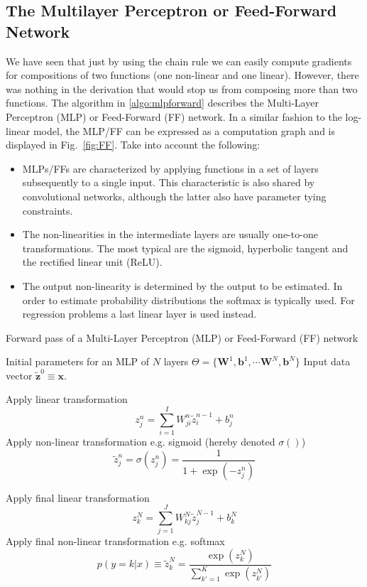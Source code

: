 \subsection{The Multilayer Perceptron or Feed-Forward Network}

We have seen that just by using the chain rule we can easily compute gradients for
compositions of two functions (one non-linear and one linear). However, there
was nothing in the derivation that would stop us from composing more than two
functions. The algorithm in \ref{algo:mlpforward} describes the Multi-Layer Perceptron (MLP) or Feed-Forward (FF) network. In a similar fashion to the log-linear model, the MLP/FF can be expressed as a computation graph and is displayed in Fig.~\ref{fig:FF}. Take into account the following:

%
\begin{itemize}
\item MLPs/FFs are characterized by applying functions in a set of layers subsequently to a single input. This characteristic is also shared by convolutional networks, although the latter also have parameter tying constraints.
\item The non-linearities in the intermediate layers are usually one-to-one transformations. The most typical are the sigmoid, hyperbolic tangent and the rectified linear unit (ReLU).
\item The output non-linearity is determined by the output to be estimated. In order to estimate probability distributions the softmax is typically used. For regression problems a last linear layer is used instead.
\end{itemize}



\begin{algorithm}[th!]
   \caption{Forward pass of a Multi-Layer Perceptron (MLP) or Feed-Forward (FF) network}
\begin{algorithmic}[1]
\label{algo:mlpforward}

    Initial parameters for an MLP of $N$ layers $\Theta=\{\mathbf{W}^1, \mathbf{b}^1, \cdots \mathbf{W}^N, \mathbf{b}^N\}$
    Input data vector $\mathbf{\tilde{z}}^{0}  \equiv \mathbf{x}$.

     \STATE Apply  linear transformation
        $$z_j^n = \sum_{i=1}^{I} W_{ji}^n \tilde{z}_i^{n-1} + b_j^n$$
     \STATE Apply non-linear transformation e.g. sigmoid (hereby denoted $\sigma()$)
     $$\tilde{z}_j^n = \sigma(z_j^n)  = \frac{1}{1+\exp(-z_j^n)}$$

	\ENDFOR

\STATE Apply final linear transformation
   $$z_k^N = \sum_{j=1}^{J} W_{kj}^N \tilde{z}_j^{N-1} + b_k^N$$
\STATE Apply final non-linear transformation e.g. softmax
$$p(y=k|{x}) \equiv \tilde{z}_k^N = \frac{\exp(z_k^N)}{\sum_{k'=1}^{K} \exp(z_{k'}^N)}$$

\end{algorithmic}
\end{algorithm}

